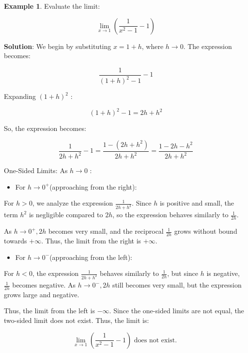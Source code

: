 \documentclass[
]{book}
\providecommand{\tightlist}{%
  \setlength{\itemsep}{0pt}\setlength{\parskip}{0pt}}
\theoremstyle{definition}
\theoremstyle{definition}
\newtheorem{example}{Example}[chapter]
\theoremstyle{definition}
\theoremstyle{definition}
\theoremstyle{remark}
\begin{document}
\begin{example}
\protect\hypertarget{exm:unnamed-chunk-34}{}\label{exm:unnamed-chunk-34}Evaluate the limit:

\[
\lim _{x \rightarrow 1}\left(\frac{1}{x^{2}-1}-1\right)
\]

\textbf{Solution}: We begin by substituting \(x=1+h\), where \(h \rightarrow 0\). The expression becomes:

\[
\frac{1}{(1+h)^{2}-1}-1
\]

Expanding \((1+h)^{2}\) :

\[
(1+h)^{2}-1=2 h+h^{2}
\]

So, the expression becomes:

\[
\frac{1}{2 h+h^{2}}-1=\frac{1-\left(2 h+h^{2}\right)}{2 h+h^{2}}=\frac{1-2 h-h^{2}}{2 h+h^{2}}
\]

One-Sided Limits: As \(h \rightarrow 0\) :

\begin{itemize}
\tightlist
\item
  For \(h \rightarrow 0^{+}\)(approaching from the right):
\end{itemize}

For \(h>0\), we analyze the expression \(\frac{1}{2 h+h^{2}}\). Since \(h\) is positive and small, the term \(h^{2}\) is negligible compared to \(2 h\), so the expression behaves similarly to \(\frac{1}{2 h}\).

As \(h \rightarrow 0^{+}, 2 h\) becomes very small, and the reciprocal \(\frac{1}{2 h}\) grows without bound towards \(+\infty\).
Thus, the limit from the right is \(+\infty\).

\begin{itemize}
\tightlist
\item
  For \(h \rightarrow 0^{-}\)(approaching from the left):
\end{itemize}

For \(h<0\), the expression \(\frac{1}{2 h+h^{2}}\) behaves similarly to \(\frac{1}{2 h}\), but since \(h\) is negative, \(\frac{1}{2 h}\) becomes negative. As \(h \rightarrow 0^{-}, 2 h\) still becomes very small, but the expression grows large and negative.

Thus, the limit from the left is \(-\infty\).
Since the one-sided limits are not equal, the two-sided limit does not exist.
Thus, the limit is:

\[
\lim _{x \rightarrow 1}\left(\frac{1}{x^{2}-1}-1\right) \text { does not exist. }
\]
\end{example}
\end{document}
